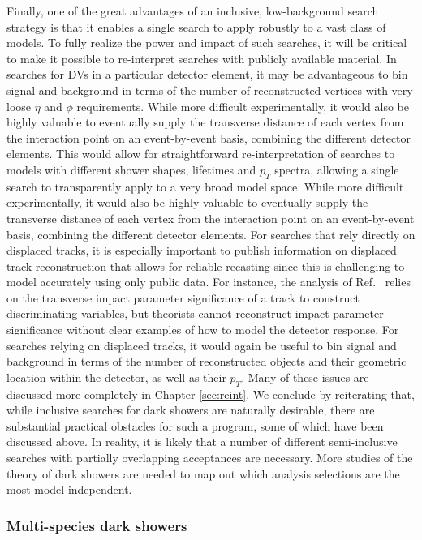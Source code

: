 \begin{enumerate}
Finally, one of the great advantages of an inclusive, low-background search strategy is that it enables a single search to apply robustly to a vast class of models.  To fully realize the power and impact of such searches, it will be critical to make it possible to re-interpret searches with publicly available material.  In searches for DVs in a particular detector element, it may be advantageous to bin signal and background in terms of the number of reconstructed vertices with very loose $\eta$ and $\phi$ requirements. While more difficult experimentally, it would also be highly valuable to eventually supply the transverse distance of each vertex from the interaction point on an event-by-event basis, combining the different detector elements. This would allow for straightforward re-interpretation of searches to models with different shower shapes, lifetimes and $p_T$ spectra, allowing a single search to transparently apply to a very broad model space.   While more difficult experimentally, it would also be highly valuable to eventually supply the transverse distance of each vertex from the interaction point on an event-by-event basis, combining the different detector elements. For searches that rely directly on displaced tracks, it is especially important to publish information on displaced track reconstruction that allows for reliable recasting since this is challenging to model accurately using only public data.
  For instance, the analysis of Ref.~\cite{Sirunyan:2018njd} relies on the transverse impact parameter significance of a track to construct discriminating variables, but theorists cannot reconstruct impact parameter significance without clear examples of how to model the detector response.   For searches relying on displaced tracks, it would again be useful to bin signal and background in terms of the number of reconstructed objects and their geometric location within the detector, as well as their $p_T$. Many of these issues are discussed more completely in Chapter \ref{sec:reint}. We conclude by reiterating that, while inclusive searches for dark showers are naturally desirable, there are substantial practical obstacles for such a program, some of which have been discussed above. In reality, it is likely that a number of different semi-inclusive searches with partially overlapping acceptances are necessary. More studies of the theory of dark showers are needed to map out which analysis selections are the most model-independent.



\subsubsection{Multi-species dark showers \label{sec:darkshowersemivisible}}


\end{enumerate}
